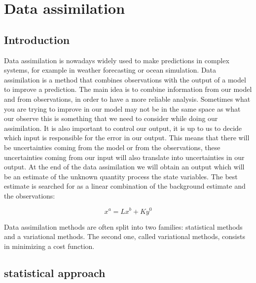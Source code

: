 \section{Data assimilation}

\subsection{Introduction}
\noindent Data assimilation is nowadays widely used to make predictions in complex systems, for example in weather forecasting or ocean simulation. Data assimilation is a method that combines observations with the output of a model to improve a prediction. 
The main idea is to combine information from our model and from observations, in order to have a more reliable analysis. Sometimes what you are trying to improve in our model may not be in the same space as what our observe this is something that we need to consider while doing our assimilation. It is also important to control our output, it is up to us to decide which input is responsible for the error in our output. This means that there will be uncertainties coming from the model or from the observations, these uncertainties coming from our input will also translate into uncertainties in our output.
At the end of the data assimilation we will obtain an output which will be an estimate of the unknown quantity process the state variables.
The best estimate is searched for as a linear combination of the background estimate and the observations:

$$x^a=Lx^b+Ky^0$$


\noindent Data assimilation methods are often split into two families: statistical methods and a variational methods.
The second one, called variational methods, consists in minimizing a cost function.
\subsection{statistical approach}
